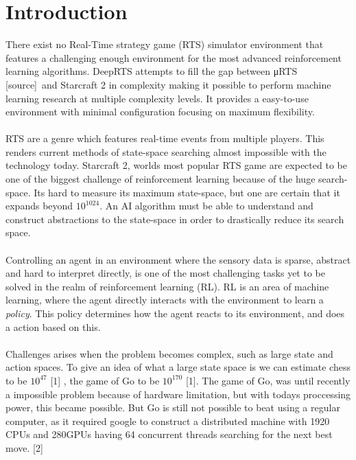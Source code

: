 \documentclass[fleqn,10pt]{article} %
\begin{document}
\section{Introduction} %
There exist no Real-Time strategy game (RTS) simulator environment that features a challenging enough environment for the most advanced reinforcement learning algorithms. DeepRTS attempts to fill the gap between μRTS [source] and Starcraft 2 in complexity making it possible to perform machine learning research at multiple complexity levels. It provides a easy-to-use environment with minimal configuration focusing on maximum flexibility.
\\
\\
RTS are a genre which features real-time events from multiple players. This renders current methods of state-space searching almost impossible with the technology today. Starcraft 2, worlds most popular RTS game are expected to be one of the biggest challenge of reinforcement learning because of the huge search-space. Its hard to measure its maximum state-space, but one are certain that it expands beyond $10^{1024}$. An AI algorithm must be able to understand and construct abstractions to the state-space in order to drastically reduce its search space.
\\
\\
Controlling an agent in an environment where the sensory data is sparse, abstract and hard to interpret directly, is one of the most challenging tasks yet to be solved in the realm of reinforcement learning (RL). RL is an area of machine learning, where the agent directly interacts  with the environment to learn a \textit{policy}. This policy determines how the agent reacts to its environment, and does a action based on this.
\\
\\
Challenges arises when the problem becomes complex, such as large state and action spaces. To give an idea of what a large state space is we can estimate chess to be $10^{47}$ [1] , the game of Go to be $10^{170}$ [1]. The game of Go, was until recently a impossible problem because of hardware limitation, but with todays proccessing power, this became possible. But Go is still not possible to beat using a regular computer, as it required google to construct a distributed machine with 1920 CPUs  and 280GPUs having 64 concurrent threads  searching for the next best move. [2]
\\
\\
\end{document}
